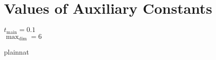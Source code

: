 \documentclass[12pt]{article}
\begin{document}




\section{Values of Auxiliary Constants}

$t_{\text{main}} = 0.1$
\\
$\max_{\text{dim}} = 6$

\newpage

 {plainnat}





\end{document}
